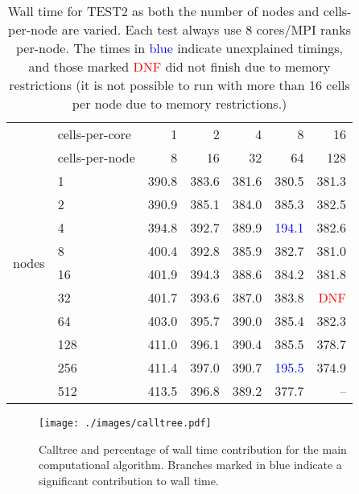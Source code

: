 \begin{table}[htp!]
    \centering
\begin{tabular}{l|l|rrrrr}
\multirow{2}{*}{}
& cells-per-core  &    1  & 2     & 4     & 8  & 16  \\
& cells-per-node  &    8  & 16    & 32    & 64 & 128 \\
\hline
\multirow{8}{*}{nodes}
&1                & 390.8 & 383.6 & 381.6 & 380.5 & 381.3\\
&2                & 390.9 & 385.1 & 384.0 & 385.3 & 382.5\\
&4                & 394.8 & 392.7 & 389.9 & \textcolor{blue}{194.1} & 382.6\\
&8                & 400.4 & 392.8 & 385.9 & 382.7 & 381.0\\
&16               & 401.9 & 394.3 & 388.6 & 384.2 & 381.8\\
&32               & 401.7 & 393.6 & 387.0 & 383.8 & \textcolor{red}{DNF}\\
&64               & 403.0 & 395.7 & 390.0 & 385.4 & 382.3 \\
&128              & 411.0 & 396.1 & 390.4 & 385.5 & 378.7 \\
&256              & 411.4 & 397.0 & 390.7 & \textcolor{blue}{195.5} & 374.9\\
&512              & 413.5 & 396.8 & 389.2 & 377.7 & --\\
\end{tabular}

\label{tbl:test2scaling}
\caption{Wall time for TEST2 as both the number of nodes and cells-per-node are varied. Each test always use 8 cores/MPI ranks per-node. The times in \textcolor{blue}{blue} indicate unexplained timings, and those marked \textcolor{red}{DNF} did not finish due to memory restrictions (it is not possible to run with more than 16 cells per node due to memory restrictions.)}
\end{table}


\begin{figure}[htp!]
\centering
\texttt{[image: ./images/calltree.pdf]}
\caption{Calltree and percentage of wall time contribution for the main computational algorithm. Branches marked in blue indicate a significant contribution to wall time.}
\label{fig:calltree}
\end{figure}


